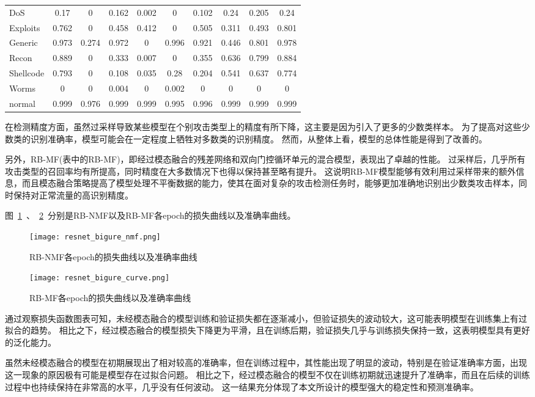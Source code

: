 \begin{table}[htbp]
\begin{tabular}{lccccccccc}
		DoS       & 0.17  & 0     & 0.162 & 0.002 & 0     & 0.102 & 0.24  & 0.205  & 0.24  \\
		Exploits  & 0.762 & 0     & 0.458 & 0.412 & 0     & 0.505 & 0.311 & 0.493  & 0.801 \\
		Generic   & 0.973 & 0.274 & 0.972 & 0     & 0.996 & 0.921 & 0.446 & 0.801  & 0.978 \\
		Recon     & 0.889 & 0     & 0.333 & 0.007 & 0     & 0.355 & 0.636 & 0.799  & 0.884 \\
		Shellcode & 0.793 & 0     & 0.108 & 0.035 & 0.28  & 0.204 & 0.541 & 0.637  & 0.774 \\
		Worms     & 0     & 0     & 0.004 & 0     & 0.002 & 0     & 0     & 0      & 0     \\
		normal    & 0.999 & 0.976 & 0.999 & 0.999 & 0.995 & 0.996 & 0.999 & 0.999  & 0.999 \\
		\bottomrule
	\end{tabular}
\end{table}
在检测精度方面，虽然过采样导致某些模型在个别攻击类型上的精度有所下降，这主要是因为引入了更多的少数类样本。
为了提高对这些少数类的识别准确率，模型可能会在一定程度上牺牲对多数类的识别精度。
然而，从整体上看，模型的总体性能是得到了改善的。\par

另外，RB-MF(表中的RB-MF)，即经过模态融合的残差网络和双向门控循环单元的混合模型，表现出了卓越的性能。
过采样后，几乎所有攻击类型的召回率均有所提高，同时精度在大多数情况下也得以保持甚至略有提升。
这说明RB-MF模型能够有效利用过采样带来的额外信息，而且模态融合策略提高了模型处理不平衡数据的能力，使其在面对复杂的攻击检测任务时，能够更加准确地识别出少数类攻击样本，同时保持对正常流量的高识别精度。\par


图~\ref{fig:ResNet-BiGRU-NoFusion-loss}~、~\ref{fig:ResNet-BiGRU-Fusion-loss}~分别是RB-NMF以及RB-MF各epoch的损失曲线以及准确率曲线。
\begin{figure}[htbp]
	\centering
	\texttt{[image: resnet\_bigure\_nmf.png]}
	\caption{RB-NMF各epoch的损失曲线以及准确率曲线}
	\label{fig:ResNet-BiGRU-NoFusion-loss}
\end{figure}
\begin{figure}[htbp]
	\centering
	\texttt{[image: resnet\_bigure\_curve.png]}
	\caption{RB-MF各epoch的损失曲线以及准确率曲线}
	\label{fig:ResNet-BiGRU-Fusion-loss}
\end{figure}
通过观察损失函数图表可知，未经模态融合的模型训练和验证损失都在逐渐减小，但验证损失的波动较大，这可能表明模型在训练集上有过拟合的趋势。
相比之下，经过模态融合的模型损失下降更为平滑，且在训练后期，验证损失几乎与训练损失保持一致，这表明模型具有更好的泛化能力。\par
虽然未经模态融合的模型在初期展现出了相对较高的准确率，但在训练过程中，其性能出现了明显的波动，特别是在验证准确率方面，出现这一现象的原因极有可能是模型存在过拟合问题。
相比之下，经过模态融合的模型不仅在训练初期就迅速提升了准确率，而且在后续的训练过程中也持续保持在非常高的水平，几乎没有任何波动。
这一结果充分体现了本文所设计的模型强大的稳定性和预测准确率。\par

